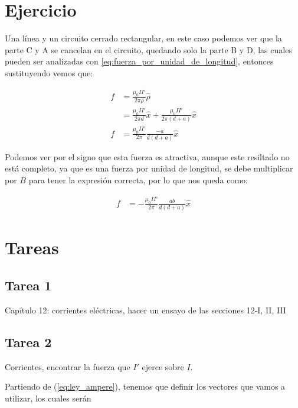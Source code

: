 \documentclass[11pt]{report}
\theoremstyle{plain}
\theoremstyle{definition}
\begin{document}
\section*{Ejercicio}
Una línea y un circuito cerrado rectangular, en este caso podemos ver que la parte C y A se cancelan en el circuito, quedando solo la parte B y D, las cuales pueden ser analizadas con \ref{eq:fuerza_por_unidad_de_longitud}, entonces sustituyendo vemos que:

\begin{align*}
	f &= \frac{\mu_0II'}{2\pi\rho}\hat{\rho}\\
 &= \frac{\mu_0II'}{2\pi d}\hat{x}+ \frac{\mu_0II'}{2\pi(d+a)}\hat{x}\\
 f &= \frac{\mu_0II'}{2\pi}\frac{-a}{d(d+a)} \hat{x}
\end{align*}

Podemos ver por el signo que esta fuerza es atractiva, aunque este resiltado no está completo, ya que es una fuerza por unidad de longitud, se debe multiplicar por $B$ para tener la expresión correcta, por lo que nos queda como:

\begin{align*}
	f &= -\frac{\mu_0II'}{2\pi}\frac{ab}{d(d+a)} \hat{x}
\end{align*}







\section{Tareas}
	\subsection{Tarea 1}
Capítulo 12: corrientes eléctricas, hacer un ensayo de las secciones 12-I, II, III

	\subsection{Tarea 2}
	
	Corrientes, encontrar la fuerza que $I'$ ejerce sobre $I$.
	
	Partiendo de (\ref{eq:ley_ampere}), tenemos que definir los vectores que vamos a utilizar, los cuales serán
	
\end{document}
